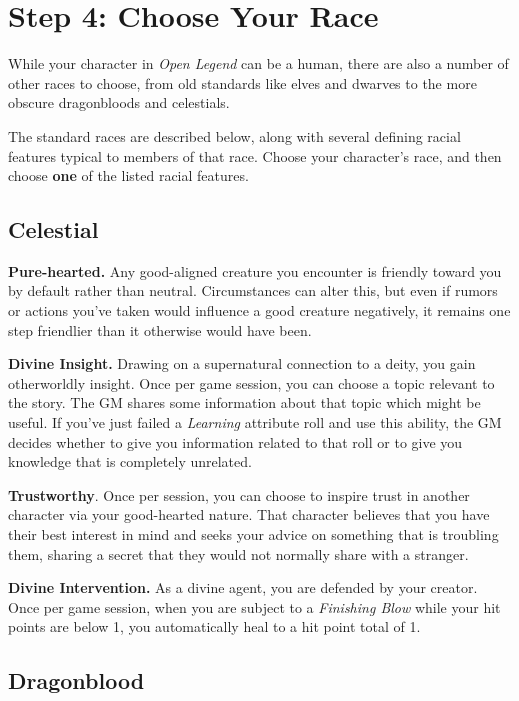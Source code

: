 \documentclass[12pt]{report}
\begin{document}
\section{Step 4: Choose Your Race}\label{step-4-choose-your-race}

While your character in \emph{Open Legend} can be a human, there are
also a number of other races to choose, from old standards like elves
and dwarves to the more obscure dragonbloods and celestials.

The standard races are described below, along with several defining
racial features typical to members of that race. Choose your character's
race, and then choose \textbf{one} of the listed racial features.

\subsection{Celestial}\label{celestial}

\textbf{Pure-hearted.} Any good-aligned creature you encounter is
friendly toward you by default rather than neutral. Circumstances can
alter this, but even if rumors or actions you've taken would influence a
good creature negatively, it remains one step friendlier than it
otherwise would have been.

\textbf{Divine Insight.} Drawing on a supernatural connection to a
deity, you gain otherworldly insight. Once per game session, you can
choose a topic relevant to the story. The GM shares some information
about that topic which might be useful. If you've just failed a
\emph{Learning} attribute roll and use this ability, the GM decides
whether to give you information related to that roll or to give you
knowledge that is completely unrelated.

\textbf{Trustworthy}. Once per session, you can choose to inspire trust
in another character via your good-hearted nature. That character
believes that you have their best interest in mind and seeks your advice
on something that is troubling them, sharing a secret that they would
not normally share with a stranger.

\textbf{Divine Intervention.} As a divine agent, you are defended by
your creator. Once per game session, when you are subject to a
\emph{Finishing Blow} while your hit points are below 1, you
automatically heal to a hit point total of 1.

\subsection{Dragonblood}\label{dragonblood}
\end{document}
